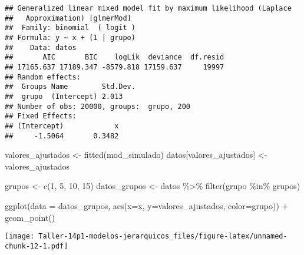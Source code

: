 \documentclass[
]{article}
\newenvironment{Shaded}{\begin{snugshade}}{\end{snugshade}}
\newcommand{\AttributeTok}[1]{\textcolor[rgb]{0.77,0.63,0.00}{#1}}
\newcommand{\DecValTok}[1]{\textcolor[rgb]{0.00,0.00,0.81}{#1}}
\newcommand{\FunctionTok}[1]{\textcolor[rgb]{0.00,0.00,0.00}{#1}}
\newcommand{\NormalTok}[1]{#1}
\newcommand{\OtherTok}[1]{\textcolor[rgb]{0.56,0.35,0.01}{#1}}
\newcommand{\SpecialCharTok}[1]{\textcolor[rgb]{0.00,0.00,0.00}{#1}}
\newcommand{\StringTok}[1]{\textcolor[rgb]{0.31,0.60,0.02}{#1}}
\begin{document}
\begin{verbatim}
## Generalized linear mixed model fit by maximum likelihood (Laplace
##   Approximation) [glmerMod]
##  Family: binomial  ( logit )
## Formula: y ~ x + (1 | grupo)
##    Data: datos
##       AIC       BIC    logLik  deviance  df.resid 
## 17165.637 17189.347 -8579.818 17159.637     19997 
## Random effects:
##  Groups Name        Std.Dev.
##  grupo  (Intercept) 2.013   
## Number of obs: 20000, groups:  grupo, 200
## Fixed Effects:
## (Intercept)            x  
##     -1.5064       0.3482
\end{verbatim}

\begin{Shaded}
\begin{Highlighting}[]
\NormalTok{valores\_ajustados }\OtherTok{\textless{}{-}} \FunctionTok{fitted}\NormalTok{(mod\_simulado)}
\NormalTok{datos[}\StringTok{\textquotesingle{}valores\_ajustados\textquotesingle{}}\NormalTok{] }\OtherTok{\textless{}{-}}\NormalTok{ valores\_ajustados}
\end{Highlighting}
\end{Shaded}

\begin{Shaded}
\begin{Highlighting}[]
\NormalTok{grupos }\OtherTok{\textless{}{-}} \FunctionTok{c}\NormalTok{(}\DecValTok{1}\NormalTok{, }\DecValTok{5}\NormalTok{, }\DecValTok{10}\NormalTok{, }\DecValTok{15}\NormalTok{)}
\NormalTok{datos\_grupos }\OtherTok{\textless{}{-}}\NormalTok{ datos }\SpecialCharTok{\%\textgreater{}\%} \FunctionTok{filter}\NormalTok{(grupo }\SpecialCharTok{\%in\%}\NormalTok{ grupos)}
\end{Highlighting}
\end{Shaded}

\begin{Shaded}
\begin{Highlighting}[]
\FunctionTok{ggplot}\NormalTok{(}\AttributeTok{data =}\NormalTok{ datos\_grupos, }\FunctionTok{aes}\NormalTok{(}\AttributeTok{x=}\NormalTok{x, }\AttributeTok{y=}\NormalTok{valores\_ajustados, }\AttributeTok{color=}\NormalTok{grupo)) }\SpecialCharTok{+}
  \FunctionTok{geom\_point}\NormalTok{()}
\end{Highlighting}
\end{Shaded}

\texttt{[image: Taller-14p1-modelos-jerarquicos\_files/figure-latex/unnamed-chunk-12-1.pdf]}
\end{document}
